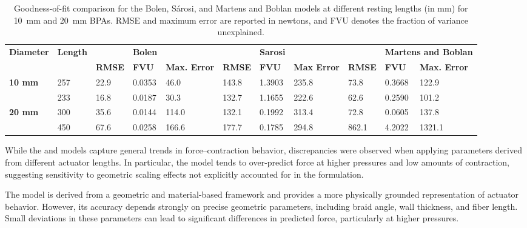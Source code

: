 \begin{table}[H]
\caption{Goodness-of-fit comparison for the Bolen, Sárosi, and Martens and Boblan models at different resting lengths (in mm) for \qty{10}{\mm} and \qty{20}{\mm} BPAs. RMSE and maximum error are reported in newtons, and FVU denotes the fraction of variance unexplained.}
\label{tab:model_compare}
\tiny
\begin{adjustwidth}{-2cm}{0cm}
\begin{tabularx}{\textwidth}{@{}lllllllllll@{}}
\toprule
\textbf{Diameter} &
  \textbf{Length} &
  \textbf{} &
  \textbf{Bolen} &
  \textbf{} &
  \textbf{} &
  \textbf{Sarosi} &
  \textbf{} &
  \textbf{} &
  \multicolumn{2}{l}{\textbf{Martens and Boblan}} \\ 
\textbf{} &
  \textbf{} &
  \textbf{RMSE} &
  \textbf{FVU} &
  \textbf{Max. Error} &
  \textbf{RMSE} &
  \textbf{FVU} &
  \textbf{Max Error} &
  \textbf{RMSE} &
  \textbf{FVU} &
  \textbf{Max. Error} \\ \midrule
\textbf{10 mm} & 257 & 22.9 & 0.0353 & 46.0  & 143.8 & 1.3903 & 235.8 & 73.8  & 0.3668 & 122.9  \\
\textbf{}      & 233 & 16.8 & 0.0187 & 30.3  & 132.7 & 1.1655 & 222.6 & 62.6  & 0.2590 & 101.2  \\ \midrule
\textbf{20 mm} & 300 & 35.6 & 0.0144 & 114.0 & 132.1 & 0.1992 & 313.4 & 72.8  & 0.0605 & 137.8  \\
\textbf{}      & 450 & 67.6 & 0.0258 & 166.6 & 177.7 & 0.1785 & 294.8 & 862.1 & 4.2022 & 1321.1 \\ \bottomrule
\end{tabularx}
\end{adjustwidth}
\end{table}

While the \citet{sarosi_new_2012} and \citet{sarosi_10mm} models capture general trends in force–contraction behavior, discrepancies were observed when applying parameters derived from different actuator lengths. In particular, the model tends to over-predict force at higher pressures and low amounts of contraction, suggesting sensitivity to geometric scaling effects not explicitly accounted for in the formulation.

The \citet{martens_modeling_2017} model  is derived from a geometric and material-based framework and provides a more physically grounded representation of actuator behavior. However, its accuracy depends strongly on precise geometric parameters, including braid angle, wall thickness, and fiber length. Small deviations in these parameters can lead to significant differences in predicted force, particularly at higher pressures.

